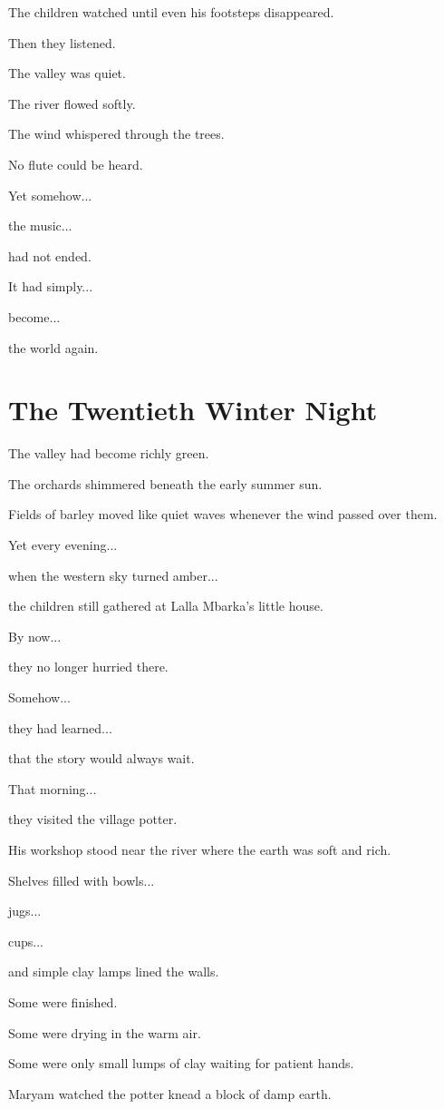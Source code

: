 \documentclass[12pt,openany]{book}
\begin{document}
The children watched until even his footsteps disappeared.

Then they listened.

The valley was quiet.

The river flowed softly.

The wind whispered through the trees.

No flute could be heard.

Yet somehow...

the music...

had not ended.

It had simply...

become...

the world again.
\chapter{The Twentieth Winter Night}

The valley had become richly green.

The orchards shimmered beneath the early summer sun.

Fields of barley moved like quiet waves whenever the wind passed over them.

Yet every evening...

when the western sky turned amber...

the children still gathered at Lalla Mbarka's little house.

By now...

they no longer hurried there.

Somehow...

they had learned...

that the story would always wait.

That morning...

they visited the village potter.

His workshop stood near the river where the earth was soft and rich.

Shelves filled with bowls...

jugs...

cups...

and simple clay lamps lined the walls.

Some were finished.

Some were drying in the warm air.

Some were only small lumps of clay waiting for patient hands.

Maryam watched the potter knead a block of damp earth.
\end{document}
